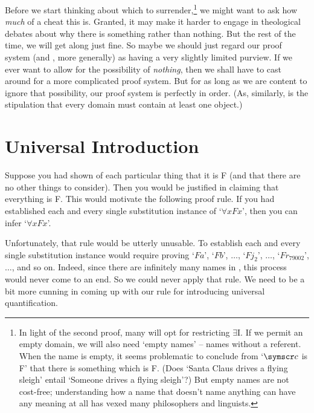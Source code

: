 Before we start thinking about which to surrender,\footnote{In light of the second proof, many will opt for restricting $\exists$I. If we permit an empty domain, we will also need `empty names' – names without a referent. When the name  is empty, it seems problematic to conclude from `$\meta{c}$ is F' that there is something which is F. (Does `Santa Claus drives a flying sleigh' entail `Someone drives a flying sleigh'?) But empty names are not cost-free; understanding how a name that doesn't name anything can have any meaning at all has vexed many philosophers and linguists.} we might want to ask how \emph{much} of a cheat this is. Granted, it may make it harder to engage in theological debates about why there is something rather than nothing. But the rest of the time, we will get along just fine. So maybe we should just regard our proof system (and \FOL, more generally) as having a very slightly limited purview. If we ever want to allow for the possibility of \emph{nothing}, then we shall have to cast around for a more complicated proof system. But for as long as we are content to ignore that possibility, our proof system is perfectly in order. (As, similarly, is the stipulation that every domain must contain at least one object.)



\section{Universal Introduction}\label{uniint}
Suppose you had shown of each particular thing that it is F (and that there are no other things to consider). Then you would be justified in claiming that everything is F. This would motivate the following proof rule. If you had established each and every single substitution instance of `$\forall x Fx$', then you can infer `$\forall x Fx$'. 

Unfortunately, that rule would be utterly unusable. To establish each and every single substitution instance would require proving `$Fa$', `$Fb$', $…$, `$Fj_2$', $…$, `$Fr_{79002}$', $…$, and so on. Indeed, since there are infinitely many names in \FOL, this process would never come to an end. So we could never apply that rule. We need to be a bit more cunning in coming up with our rule for introducing universal quantification. 

